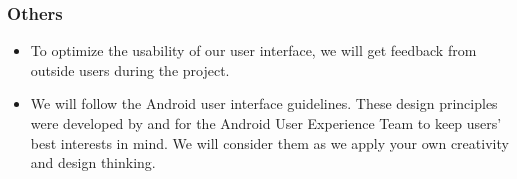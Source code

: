 \subsubsection{Others}

\begin{itemize}
\item To optimize the usability of our user interface, we will get feedback from outside users during the project.
\item We will follow the Android user interface guidelines. These design principles were developed by and for the Android User Experience Team to keep users' best interests in mind. We will consider them as we apply your own creativity and design thinking.
\end{itemize}



